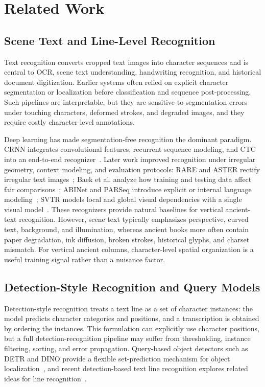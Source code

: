 \section{Related Work}

\subsection{Scene Text and Line-Level Recognition}

Text recognition converts cropped text images into character sequences and is central to OCR, scene text understanding, handwriting recognition, and historical document digitization. Earlier systems often relied on explicit character segmentation or localization before classification and sequence post-processing. Such pipelines are interpretable, but they are sensitive to segmentation errors under touching characters, deformed strokes, and degraded images, and they require costly character-level annotations.

Deep learning has made segmentation-free recognition the dominant paradigm. CRNN integrates convolutional features, recurrent sequence modeling, and CTC into an end-to-end recognizer~\cite{shi2017crnn}. Later work improved recognition under irregular geometry, context modeling, and evaluation protocols: RARE and ASTER rectify irregular text images~\cite{shi2016rare,shi2018aster}; Baek et al. analyze how training and testing data affect fair comparisons~\cite{baek2019wrong}; ABINet and PARSeq introduce explicit or internal language modeling~\cite{fang2021abinet,bautista2022parseq}; SVTR models local and global visual dependencies with a single visual model~\cite{du2022svtr}. These recognizers provide natural baselines for vertical ancient-text recognition. However, scene text typically emphasizes perspective, curved text, background, and illumination, whereas ancient books more often contain paper degradation, ink diffusion, broken strokes, historical glyphs, and charset mismatch. For vertical ancient columns, character-level spatial organization is a useful training signal rather than a nuisance factor.

\subsection{Detection-Style Recognition and Query Models}

Detection-style recognition treats a text line as a set of character instances: the model predicts character categories and positions, and a transcription is obtained by ordering the instances. This formulation can explicitly use character positions, but a full detection-recognition pipeline may suffer from thresholding, instance filtering, sorting, and error propagation. Query-based object detectors such as DETR and DINO provide a flexible set-prediction mechanism for object localization~\cite{carion2020detr,zhang2023dino}, and recent detection-based text line recognition explores related ideas for line recognition~\cite{baena2024dtlr}.

